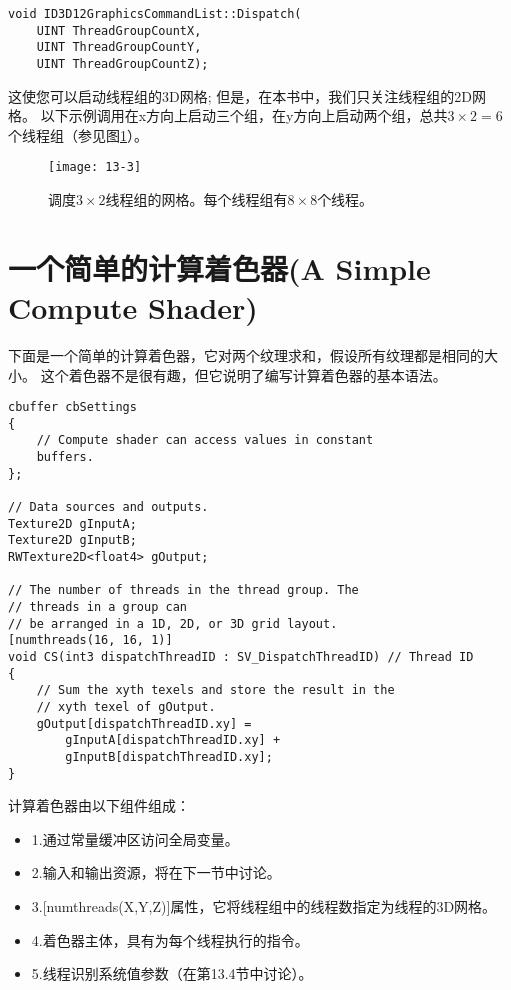 \begin{lstlisting}
void ID3D12GraphicsCommandList::Dispatch(
    UINT ThreadGroupCountX,
    UINT ThreadGroupCountY,
    UINT ThreadGroupCountZ);
\end{lstlisting}

\begin{flushleft}
这使您可以启动线程组的3D网格; 但是，在本书中，我们只关注线程组的2D网格。 以下示例调用在x方向上启动三个组，在y方向上启动两个组，总共$3\times 2=6$个线程组（参见图\ref{fig:13-3}）。\\
\end{flushleft}

\begin{figure}[h]
    \texttt{[image: 13-3]}
    \centering
    \caption{调度$3\times 2$线程组的网格。每个线程组有$8\times 8$个线程。}
    \label{fig:13-3}
\end{figure}

\section{一个简单的计算着色器(A Simple Compute Shader)}
\begin{flushleft}
下面是一个简单的计算着色器，它对两个纹理求和，假设所有纹理都是相同的大小。 这个着色器不是很有趣，但它说明了编写计算着色器的基本语法。\\
\end{flushleft}

\begin{lstlisting}
cbuffer cbSettings
{
    // Compute shader can access values in constant
    buffers.
};

// Data sources and outputs.
Texture2D gInputA;
Texture2D gInputB;
RWTexture2D<float4> gOutput;

// The number of threads in the thread group. The
// threads in a group can
// be arranged in a 1D, 2D, or 3D grid layout.
[numthreads(16, 16, 1)]
void CS(int3 dispatchThreadID : SV_DispatchThreadID) // Thread ID
{
    // Sum the xyth texels and store the result in the
    // xyth texel of gOutput.
    gOutput[dispatchThreadID.xy] =
        gInputA[dispatchThreadID.xy] +
        gInputB[dispatchThreadID.xy];
}
\end{lstlisting}

\begin{flushleft}
计算着色器由以下组件组成：\\
\end{flushleft}

\begin{itemize}
  \item 1.通过常量缓冲区访问全局变量。
  \item 2.输入和输出资源，将在下一节中讨论。
  \item 3.[numthreads(X,Y,Z)]属性，它将线程组中的线程数指定为线程的3D网格。
  \item 4.着色器主体，具有为每个线程执行的指令。
  \item 5.线程识别系统值参数（在第13.4节中讨论）。
\end{itemize}

